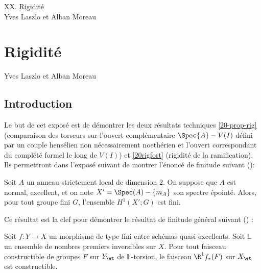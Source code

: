 \documentclass[10pt]{../fichiers-configuration-latex/smfart}
\begin{document}
\begin{center} XX. Rigidité\\ Yves Laszlo et Alban Moreau \end{center}

\date{exposés oraux des 22 juin 2007 et 11 juin 2008, notes du 29 août 2008}

\setcounter{tocdepth}{2}
\tableofcontents

\else
{}
\chapter{Rigidité}
\begin{center} Yves Laszlo et Alban Moreau
\end{center}
\fi


\section{Introduction} Le but de cet exposé est de démontrer les deux résultats techniques
\ref{20-prop-rig} (comparaison des torseurs sur l'ouvert complémentaire $\Spec{A}-V(I)$ défini par
un couple hensélien non nécessairement noethérien et l'ouvert correspondant du complété formel le
long de $V(I)$) et \ref{20rigfort} (rigidité de la ramification). Ils permettront dans l'exposé
suivant de montrer l'énoncé de finitude suivant ():

\begin{theoreme0}[Gabber]   Soit $A$ un anneau strictement local de dimension $2$.  On suppose que
$A$ est normal, excellent, et on note $X'=\Spec(A)-\{\mathfrak{m}_A\}$  son spectre épointé.  Alors,
pour tout groupe fini $G$,   l'ensemble $H^1(X';G)$ est fini.\end{theoreme0}

Ce résultat est la clef pour démontrer le résultat de finitude général suivant
() :

\begin{theoreme0}[Gabber]    Soit $f:Y \rightarrow X$ un morphisme de type fini   entre schémas
quasi-excellents.  Soit $\mathbb L$ un ensemble de nombres premiers inversibles sur $X$.  Pour tout
faisceau constructible de groupes $F$ sur $Y_\et$    de $\mathbb L$-torsion,  le faisceau $\R^1
f_*(F)$ sur $X_\et$ est constructible. \end{theoreme0}
\end{document}
